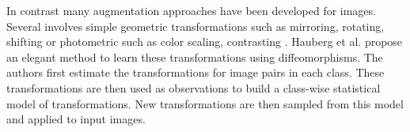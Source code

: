 In contrast many augmentation approaches have been developed for images. Several involves simple geometric
transformations such as mirroring, rotating, shifting \cite{Gu2018} or photometric such as color scaling, contrasting
\cite{Eigen2015}. Hauberg et al. \cite{Hauberg2016Diffeomorphism} propose an elegant method to learn these
transformations using diffeomorphisms. The authors first estimate the transformations for image pairs in each class.
These transformations are then used as observations to build a class-wise statistical model of transformations.
New transformations are then sampled from this model and applied to input images.


